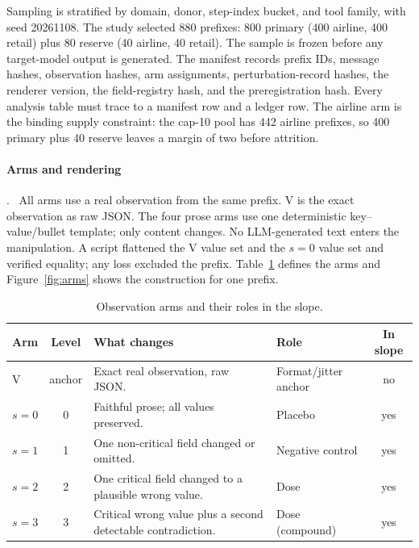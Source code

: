 \documentclass[a4paper,fleqn]{cas-sc}
\begin{document}
Sampling is stratified by domain, donor, step-index bucket, and tool family, with seed 20261108.
The study selected 880 prefixes: 800 primary (400 airline, 400 retail) plus 80 reserve (40
airline, 40 retail). The sample is frozen before any target-model output is generated. The
manifest records prefix IDs, message hashes, observation hashes, arm assignments,
perturbation-record hashes, the renderer version, the field-registry hash, and the preregistration
hash. Every analysis table must trace to a manifest row and a ledger row. The airline arm is the
binding supply constraint: the cap-10 pool has 442 airline prefixes, so 400 primary plus 40
reserve leaves a margin of two before attrition.

\paragraph{Arms and rendering}.\ \label{sec:arms}
All arms use a real observation from the same prefix. V is the exact observation as raw JSON. The
four prose arms use one deterministic key--value/bullet template; only content changes. No
LLM-generated text enters the manipulation. A script flattened the V value set and the $s=0$ value
set and verified equality; any loss excluded the prefix. Table~\ref{tab:arms} defines the arms
and Figure~\ref{fig:arms} shows the construction for one prefix.

\begin{table}[pos=htbp]
  \centering
  \caption{Observation arms and their roles in the slope.}
  \label{tab:arms}
  \small
  \begin{tabular}{>{\raggedright\arraybackslash}p{1.3cm}c>{\raggedright\arraybackslash}p{6.3cm}>{\raggedright\arraybackslash}p{4.6cm}c}
    \toprule
    \textbf{Arm} & \textbf{Level} & \textbf{What changes} & \textbf{Role} & \textbf{In slope} \\
    \midrule
    V     & anchor & Exact real observation, raw JSON. & Format/jitter anchor & no \\
    $s=0$ & 0      & Faithful prose; all values preserved. & Placebo & yes \\
    $s=1$ & 1      & One non-critical field changed or omitted. & Negative control & yes \\
    $s=2$ & 2      & One critical field changed to a plausible wrong value. & Dose & yes \\
    $s=3$ & 3      & Critical wrong value plus a second detectable contradiction. & Dose (compound) & yes \\
    \bottomrule
  \end{tabular}
\end{table}
\end{document}
